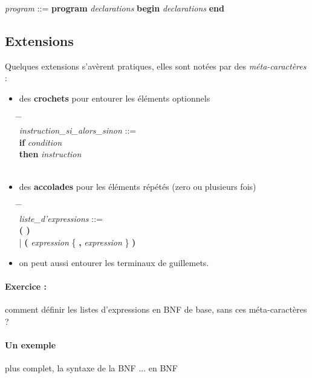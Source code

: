 \begin{center}
\emph{program} ::=  \textbf{program} \emph{declarations}
\textbf{begin} \emph{declarations} \textbf{end}
\end{center}

\subsection{Extensions}

Quelques extensions s'avèrent pratiques, elles sont notées
par des \emph{méta-caractères} :
\begin{itemize}
\item des \textbf{crochets} pour entourer les éléments optionnels
\begin{tabbing}
\hspace{3cm} \= \hspace{1cm}  \= \hspace{1cm} \\
\emph{instruction\_si\_alors\_sinon} ::= \\
  \> \textbf{if} \emph{condition} \\
  \> \> \textbf{then} \emph{instruction} \\
  \>   \\
\end{tabbing}

\item des \textbf{accolades} pour les éléments répétés (zero ou plusieurs fois)
\begin{tabbing}
\hspace{3cm} \= \hspace{1cm}  \= \hspace{1cm} \\
\emph{liste\_d'expressions} ::= \\
  \> \textbf{( ) } \\
  \> | \textbf{(} \emph{expression} \{ \textbf{,} \emph{expression} \} \textbf{)}
\end{tabbing}
\item on peut aussi entourer les terminaux 
de guillemets.
\end{itemize}

\paragraph{Exercice :} comment définir les listes d'expressions en BNF de base, 
sans  ces méta-caractères ?

\paragraph*{Un exemple} plus complet, la syntaxe de la BNF ... en BNF


